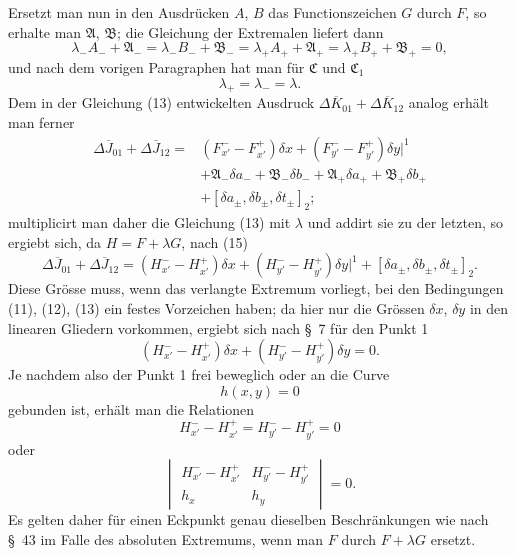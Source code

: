 \documentclass[11pt,a4paper,leqno]{article}
\begin{document}
Ersetzt man nun in den Ausdrücken $A$, $B$ das Functionszeichen $G$ durch $F$, so erhalte man $\mathfrak A$, $\mathfrak B$; die Gleichung der Extremalen liefert dann
\begin{equation}\tag{15}
\lambda_-A_-+\mathfrak A_-=
\lambda_-B_-+\mathfrak B_-=
\lambda_+A_+ +\mathfrak A_+=
\lambda_+B_+ +\mathfrak B_+=0,
\end{equation}
und nach dem vorigen Paragraphen hat man für $\mathfrak C$ und $\mathfrak C_1$
\[
\lambda_+=\lambda_-=\lambda.
\]
Dem in der Gleichung (13) entwickelten Ausdruck $\Delta\overline K_{01}+\Delta\overline K_{12}$ analog erhält man ferner
\[
\begin{aligned}
\Delta\overline J_{01}+\Delta\overline J_{12}
={}&(F_{x'}^- -F_{x'}^+)\delta x+(F_{y'}^- -F_{y'}^+)\delta y\bigg|^1\\
&+\mathfrak A_-\delta a_-+\mathfrak B_-\delta b_-+\mathfrak A_+\delta a_+ +\mathfrak B_+\delta b_+ \\
&+[\delta a_\pm,\delta b_\pm,\delta t_\pm]_2;
\end{aligned}
\]
multiplicirt man daher die Gleichung (13) mit $\lambda$ und addirt sie zu der letzten, so ergiebt sich, da $H=F+\lambda G$, nach (15)
\[
\Delta\overline J_{01}+\Delta\overline J_{12}
=(H_{x'}^- -H_{x'}^+)\delta x+(H_{y'}^- -H_{y'}^+)\delta y\bigg|^1
+[\delta a_\pm,\delta b_\pm,\delta t_\pm]_2.
\]
Diese Grösse muss, wenn das verlangte Extremum vorliegt, bei den Bedingungen (11), (12), (13) ein festes Vorzeichen haben; da hier nur die Grössen $\delta x$, $\delta y$ in den linearen Gliedern vorkommen, ergiebt sich nach \S~7 für den Punkt 1
\begin{equation}\tag{16}
(H_{x'}^- -H_{x'}^+)\delta x+(H_{y'}^- -H_{y'}^+)\delta y=0.
\end{equation}
Je nachdem also der Punkt 1 frei beweglich oder an die Curve
\[
h(x,y)=0
\]
gebunden ist, erhält man die Relationen
\[
H_{x'}^- -H_{x'}^+=H_{y'}^- -H_{y'}^+=0
\]
oder
\[
\begin{vmatrix}
H_{x'}^- -H_{x'}^+&H_{y'}^- -H_{y'}^+\\
h_x&h_y
\end{vmatrix}=0.
\]
Es gelten daher für einen Eckpunkt genau dieselben Beschränkungen wie nach \S~43 im Falle des absoluten Extremums, wenn man $F$ durch $F+\lambda G$ ersetzt.
\end{document}

